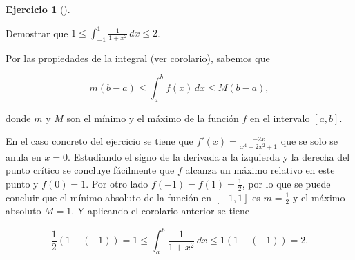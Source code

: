 \documentclass[
  a4paper,
]{scrreport}
\theoremstyle{definition}
\newtheorem{exercise}{Ejercicio}[chapter]
\theoremstyle{remark}
\begin{document}
\begin{exercise}[]\protect\hypertarget{exr-cota-integral}{}\label{exr-cota-integral}

Demostrar que
\(1\leq \displaystyle \int_{-1}^1 \frac{1}{1+x^2}\,dx \leq 2\).

\end{exercise}

\begin{tcolorbox}[enhanced jigsaw, coltitle=black, toptitle=1mm, colframe=quarto-callout-tip-color-frame, colbacktitle=quarto-callout-tip-color!10!white, breakable, opacityback=0, bottomtitle=1mm, opacitybacktitle=0.6, title=\textcolor{quarto-callout-tip-color}{\faLightbulb}\hspace{0.5em}{Solución}, arc=.35mm, leftrule=.75mm, toprule=.15mm, titlerule=0mm, bottomrule=.15mm, left=2mm, rightrule=.15mm, colback=white]

Por las propiedades de la integral (ver
\href{https://aprendeconalf.es/analisis-manual/08-integrales.html\#cor-integral-funcion-acotada}{corolario}),
sabemos que

\[
m(b-a)\leq \int_a^b f(x)\,dx \leq M(b-a),
\]

donde \(m\) y \(M\) son el mínimo y el máximo de la función \(f\) en el
intervalo \([a,b]\).

En el caso concreto del ejercicio se tiene que
\(f'(x) = \frac{-2x}{x^4+2x^2+1}\) que se solo se anula en \(x=0\).
Estudiando el signo de la derivada a la izquierda y la derecha del punto
crítico se concluye fácilmente que \(f\) alcanza un máximo relativo en
este punto y \(f(0)=1\). Por otro lado \(f(-1)=f(1)=\frac{1}{2}\), por
lo que se puede concluir que el mínimo absoluto de la función en
\([-1,1]\) es \(m=\frac{1}{2}\) y el máximo absoluto \(M=1\). Y
aplicando el corolario anterior se tiene

\[
\frac{1}{2}(1-(-1)) = 1 \leq \int_a^b \frac{1}{1+x^2}\,dx \leq 1(1-(-1)) = 2.
\]

\end{tcolorbox}
\end{document}
